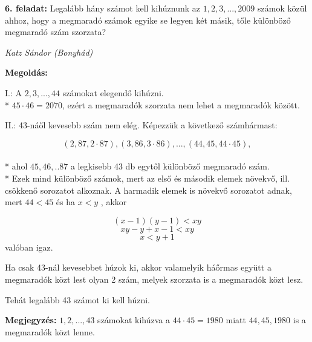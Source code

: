 \documentclass[a4paper,10pt]{article}
\def\ki#1#2{\hfill {\it #1 (#2)}\medskip}
\begin{document}
{\bf 6. feladat:} Legalább hány számot kell kihúznunk az $1, 2, 3, ..., 2009$ számok közül ahhoz, hogy a megmaradó számok egyike se legyen két másik, tőle különböző megmaradó szám szorzata?

\ki{Katz Sándor}{Bonyhád}

{\bf Megoldás:}

I.: A $2, 3, ..., 44$ számokat elegendő kihúzni. \\*
$45\cdot 46=2070$, ezért a megmaradók szorzata nem lehet a megmaradók között.

II.: 43-náől kevesebb szám nem elég.
Képezzük a következő számhármast:

$$(2, 87, 2\cdot 87), (3, 86, 3\cdot 86), ..., (44, 45, 44\cdot 45),$$ \\*
ahol $45, 46, .. 87$ a legkisebb 43 db egytől különböző megmaradó szám. \\*
Ezek mind különböző számok, mert az első és második elemek növekvő, ill. csökkenő sorozatot alkoznak. A harmadik elemek is növekvő sorozatot adnak, mert $44<45$ és ha $x<y$ , akkor

$$(x-1)(y-1)<xy$$
$$xy-y+x-1<xy$$
$$x<y+1$$
valóban igaz.

Ha csak 43-nál kevesebbet húzok ki, akkor valamelyik háőrmas együtt a megmaradók közt lest olyan 2 szám, melyek szorzata is a megmaradók közt lesz.

Tehát legalább 43 számot ki kell húzni.

{\bf Megjegyzés:} $1, 2, ..., 43$ számokat kihúzva a $44\cdot 45=1980$ miatt $44, 45, 1980$ is a megmaradók közt lenne.

\vfill
\end{document}
